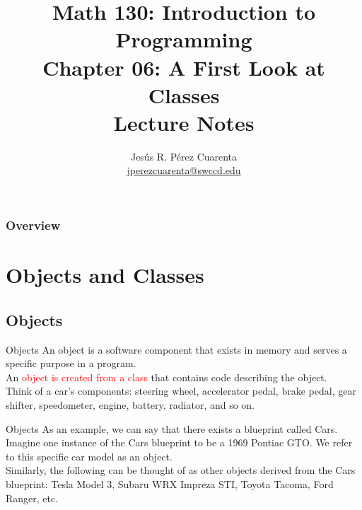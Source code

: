 \documentclass[11pt]{beamer}
\title[Chapter 06 Notes]{Math 130: Introduction to Programming \\ Chapter 06: A First Look at Classes \\ Lecture Notes}
\author{Jesús R. Pérez Cuarenta \\
\href{mailto:jperezcuarenta@swccd.edu}{jperezcuarenta@swccd.edu}
}
\date{} %
\newcommand{\red}[1]{\textcolor{red}{#1}}
\begin{document}
% 
% 

\begin{frame}
  \maketitle
\end{frame}

\begin{frame}
\frametitle{Overview}
    \tableofcontents
\end{frame}

\section{Objects and Classes}
\subsection{Objects}
\begin{frame}{Objects}
    An object is a software component that exists in memory and serves a specific purpose in a program. \\ 
    \vspace{1em}
    An \red{object is created from a class} that contains code describing the object. \\ 
    \vspace{1em} 
    Think of a car's components: steering wheel, accelerator pedal, brake pedal, gear shifter, speedometer, engine, battery, radiator, and so on. 
\end{frame}

\begin{frame}{Objects}
    As an example, we can say that there exists a blueprint called Cars. \\
    \vspace{1em}
    Imagine one instance of the Cars blueprint to be a 1969 Pontiac GTO. We refer to this specific car model as an object. \\
    \vspace{1em}
    Similarly, the following can be thought of as other objects derived from the Cars blueprint: Tesla Model 3, Subaru WRX Impreza STI, Toyota Tacoma, Ford Ranger, etc.    
\end{frame}
\end{document}
